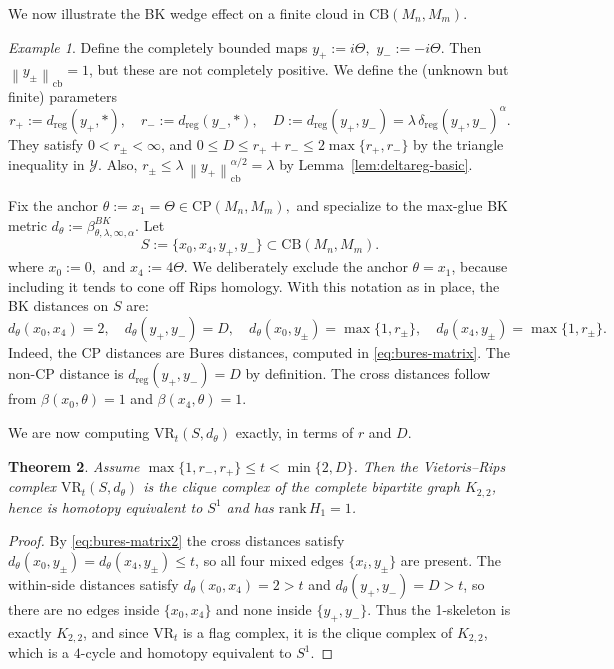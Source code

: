 \documentclass[11pt]{amsart}
\newtheorem{theorem}{Theorem}[section]
\theoremstyle{definition}
\theoremstyle{remark}
\newtheorem{example}[theorem]{Example}
\newcommand{\1}{\mathbbm{1}}
\newcommand{\cb}{\mathrm{cb}}
\newcommand{\CP}{\mathrm{CP}}
\newcommand{\CB}{\mathrm{CB}}
\newcommand{\norm}[1]{\left\lVert #1\right\rVert}
\newcommand{\VR}{\mathrm{VR}}
\begin{document}
We now illustrate the BK wedge effect on a finite cloud in $\CB(M_n,M_m)$.

\begin{example}\label{ex:go2}
Define the completely bounded maps $y_{+}:=i\Theta,$ $y_{-}:=-i\Theta.$ Then  $\norm{y_{\pm}}_{\cb}=1$, but these are not completely positive.
We define the (unknown but finite) parameters
\begin{equation}\label{eq:params}
r_+:=d_{\mathrm{reg}}(y_+,\ast),\quad r_{-}:=d_{\mathrm{reg}}(y_-,\ast),
\quad
D:=d_{\mathrm{reg}}(y_+,y_-)=\lambda\,\delta_{\mathrm{reg}}(y_+,y_-)^\alpha.
\end{equation}
They satisfy $0<r_{\pm}<\infty$, and $0\le D\le r_++r_{-}\le 2\max\{r_+,r_{-}\}$ by the triangle inequality in $\mathcal Y$.
Also, $r_{\pm}\le \lambda\,\norm{y_+}_{\cb}^{\alpha/2}=\lambda$ by Lemma~\ref{lem:deltareg-basic}.

Fix the anchor $\theta:=x_1=\Theta\in\CP(M_n,M_m),$
and specialize to the max-glue BK metric 
$d_\theta:=\beta^{BK}_{\theta,\lambda,\infty,\alpha}.$ Let
\[
S:=\{x_0,x_4,y_+,y_-\}\subset \CB(M_n,M_m).
\] where  $x_0:=0,$ and $x_4:=4\Theta$. We deliberately exclude the anchor $\theta=x_1$, because including it tends to cone off Rips homology. With this notation as in place, the BK distances on $S$ are:
\begin{equation}\label{eq:bures-matrix2}
d_\theta(x_0,x_4)=2,\quad d_\theta(y_+,y_-)=D,\quad d_\theta(x_0,y_\pm)=\max\{1,r_{\pm}\},\quad d_\theta(x_4,y_\pm)=\max\{1,r_{\pm}\}.
\end{equation}
Indeed, the CP distances are Bures distances, computed in \eqref{eq:bures-matrix}.
The non-CP distance is $d_{\mathrm{reg}}(y_+,y_-)=D$ by definition.
The cross distances follow from $\beta(x_0,\theta)=1$ and 
$\beta(x_4,\theta)=1$.
\end{example}

We are now computing $\VR_t(S,d_\theta)$ exactly, in terms of $r$ and $D$.

\begin{theorem}
\label{thm:bk-rips-loop}
Assume $\max\{1,r_{-}, r_{+}\}\le t<\min\{2,D\}$.
Then the Vietoris--Rips complex $\VR_t(S,d_\theta)$ is the clique complex of the complete bipartite graph $K_{2,2}$,
hence is homotopy equivalent to $S^1$ and has $\mathrm{rank}\,H_1=1$.
\end{theorem}

\begin{proof}
By \eqref{eq:bures-matrix2} the cross distances satisfy
$d_\theta(x_0,y_\pm)=d_\theta(x_4,y_\pm)\le t$,
so all four mixed edges $\{x_i,y_\pm\}$ are present.
The within-side distances satisfy $d_\theta(x_0,x_4)=2>t$ and $d_\theta(y_+,y_-)=D>t$,
so there are no edges inside $\{x_0,x_4\}$ and none inside $\{y_+,y_-\}$.
Thus the 1-skeleton is exactly $K_{2,2}$, and since $\VR_t$ is a flag complex, it is the clique complex of $K_{2,2}$,
which is a $4$-cycle and homotopy equivalent to $S^1$.
\end{proof}
\end{document}
